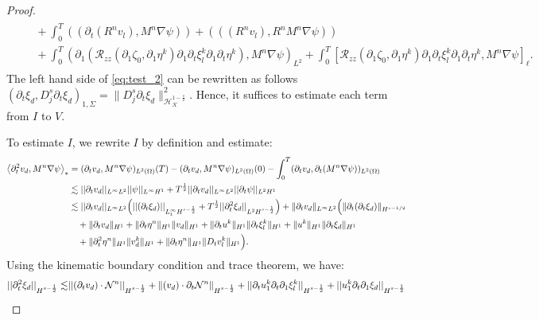 \documentclass[letterpaper,reqno,10pt,twoside]{amsart}
\theoremstyle{definition}
\theoremstyle{remark}
\def\p{\partial}
\def\f{\frac}
\begin{document}
\begin{proof}
\[\begin{aligned}
\begin{aligned}
				&\quad+\int_{0}^{T}((\p_{t}(R^{n}v_{l}),M^{n}\nabla \psi))+(
				((R^{n}v_{l}),R^{n}M^{n}\nabla\psi))\\
				&\quad+\int_{0}^{T}(\p_{1}(\mathcal{R}_{zz}(\p_{1}\zeta_{0},\p_{1}\eta^{k})\p_{1}\p_{t}\xi_{l}^{k}\p_{1}\p_{t}\eta^{k}),M^{n}\nabla \psi)_{L^{2}}+\int_{0}^{T}[\mathcal{R}_{zz}(\p_{1}\zeta_{0},\p_{1}\eta^{k})\p_{1}\p_{t}\xi_{l}^{k}\p_{1}\p_{t}\eta^{k},M^{n}\nabla \psi]_{\ell}.
			\end{aligned}
		\end{aligned}\]
		The left hand side of \eqref{eq:test_2} can be rewritten as follows
		$
		(\partial_{t}\xi_{d},D_j^s\p_t\xi_{d})_{1,\Sigma}
		=\|D_j^s\p_t\xi_{d}\|_{\mathcal{H}^{1-\f{s}2}_\mathcal{K}}^2$.
		Hence, it suffices to estimate each term from $I$ to $V$.
		
		To estimate $I$, we rewrite $I$ by definition and estimate:
		\begin{align}\label{est:dtu_m1}
			\left<\partial_{t}^{2}v_{d},M^{n}\nabla\psi\right>_{*}&=(\partial_{t}v_{d},M^{n}\nabla \psi)_{L^{2}(\Omega)}(T)-(\partial_{t}v_{d},M^{n}\nabla\psi)_{L^{2}(\Omega)}(0)-\int_{0}^{T}(\partial_{t}v_{d},\p_{t} (M^{n}\nabla \psi))_{L^{2}(\Omega)}\notag\\
			&\lesssim \vert \vert \partial_{t}v_{d}\vert \vert_{L^{\infty}L^{2}}\vert \vert \psi\vert \vert_{L^{\infty}H^{1}}+T^{\frac{1}{2}}\vert \vert \partial_{t}v_{d}\vert \vert_{L^{\infty}L^{2}}\vert \vert \partial_{t}\psi\vert \vert_{L^{2}H^{1}}\notag\\
			&\lesssim \vert \vert \partial_{t}v_{d}\vert \vert_{L^{\infty}L^{2}}\Big(\vert \vert (\partial_{t}\xi_{d})\vert \vert_{L_{t}^{\infty}H^{s-\frac{1}{2}}}+T^{\frac{1}{2}}\vert \vert \partial_{t}^{2}\xi_{d}\vert \vert_{L^{2}H^{s-\frac{1}{2}}}\Big)+\|\p_{t}v_{d}\|_{L^{\infty}L^{2}}\Big(\|\p_t(\partial_{t}\xi_{d})\|_{H^{s-1/2}}\notag\\
			&\quad+\|\p_{t}v_{d}\|_{H^{1}}+\|\p_{t}\eta^{n}\|_{H^{1}}\|v_{d}\|_{H^{1}}+\|\p_{t}u^{k}\|_{H^{1}}\|\p_{t}\xi_{l}^{k}\|_{H^{1}}+\|u^{k}\|_{H^{1}}\|\p_{t}\xi_{d}\|_{H^{1}}\notag\\
			& \quad+\|\p_{t}^{2}\eta^{n}\|_{H^{1}}\|v_{d}^{k}\|_{H^{1}}+\|\p_{t}\eta^{n}\|_{H^{1}}\|D_{t}v_{l}^{k}\|_{H^{1}}\Big).
		\end{align}
		Using the kinematic boundary condition and trace theorem, we have:
		\begin{align}
			\vert \vert\partial_{t}^{2}\xi_{d}\vert \vert_{H^{s-\frac{1}{2}}}\lesssim& \vert \vert (\p_{t}v_{d})\cdot \mathcal{N}^{n}\vert \vert_{H^{s-\frac{1}{2}}}+\|(v_{d})\cdot \p_{t}\mathcal{N}^{n}\|_{H^{s-\frac{1}{2}}}+\vert \vert \partial_{t}u_{1}^{k}\partial_{t}\partial_{1}\xi_{l}^{k}\vert \vert_{H^{s-\frac{1}{2}}}+\vert \vert u_{1}^{k}\partial_{t}\partial_{1}\xi_{d}\vert \vert_{H^{s-\frac{1}{2}}}\notag\\

\end{align}
\end{proof}
\end{document}
